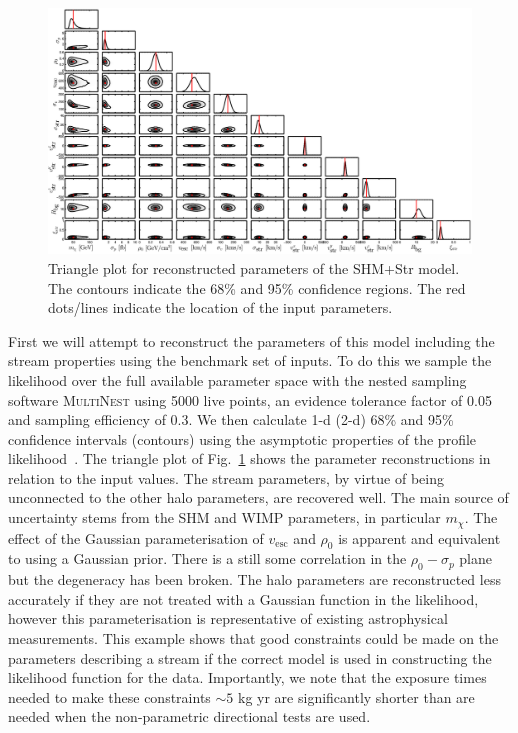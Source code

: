 \begin{figure}
	\centering
	\includegraphics[trim = 0mm 0mm 0mm 0mm, clip, width=1.5\textwidth,angle=90]{Figures/posts_11params.eps}
	\caption[Triangle plot for reconstructed parameters of the SHM+Str model]{Triangle plot for reconstructed parameters of the SHM+Str model. The contours indicate the 68\% and 95\% confidence regions. The red dots/lines indicate the location of the input parameters.}
	\label{fig:posts_11params}
\end{figure}
First we will attempt to reconstruct the parameters of this model including the stream properties using the benchmark set of inputs. To do this we sample the likelihood over the full available parameter space with the nested sampling software \textsc{Multi}N\textsc{est} \cite{Feroz:2013hea, Feroz:2008xx} using 5000 live points, an evidence tolerance factor of 0.05 and sampling efficiency of 0.3. We then calculate 1-d (2-d) 68\% and 95\% confidence intervals (contours) using the asymptotic properties of the profile likelihood~\cite{Cowan:2010js}. The triangle plot of Fig.~\ref{fig:posts_11params} shows the parameter reconstructions in relation to the input values. The stream parameters, by virtue of being unconnected to the other halo parameters, are recovered well. The main source of uncertainty stems from the SHM and WIMP parameters, in particular $m_\chi$. The effect of the Gaussian parameterisation of $v_\textrm{esc}$ and $\rho_0$ is apparent and equivalent to using a Gaussian prior. There is a still some correlation in the $\rho_0-\sigma_p$ plane but the degeneracy has been broken. The halo parameters are reconstructed less accurately if they are not treated with a Gaussian function in the likelihood, however this parameterisation is representative of existing astrophysical measurements. This example shows that good constraints could be made on the parameters describing a stream if the correct model is used in constructing the likelihood function for the data. Importantly, we note that the exposure times needed to make these constraints  $\sim 5$ kg yr are significantly shorter than are needed when the non-parametric directional tests are used.

